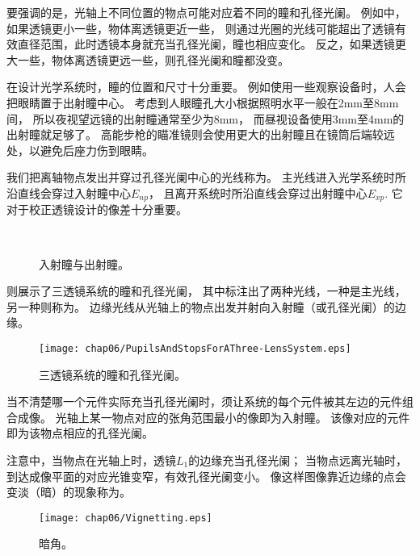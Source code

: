 要强调的是，光轴上不同位置的物点可能对应着不同的瞳和孔径光阑。
例如中，如果透镜更小一些，物体离透镜更近一些，
则通过光圈的光线可能超出了透镜有效直径范围，此时透镜本身就充当孔径光阑，瞳也相应变化。
反之，如果透镜更大一些，物体离透镜更远一些，则孔径光阑和瞳都没变。

在设计光学系统时，瞳的位置和尺寸十分重要。
例如使用一些观察设备时，人会把眼睛置于出射瞳中心。
考虑到人眼瞳孔大小根据照明水平一般在2mm至8mm间，
所以夜视望远镜的出射瞳通常至少为8mm，
而昼视设备使用3mm至4mm的出射瞳就足够了。
高能步枪的瞄准镜则会使用更大的出射瞳且在镜筒后端较远处，以避免后座力伤到眼睛。

我们把离轴物点发出并穿过孔径光阑中心的光线称为。
主光线进入光学系统时所沿直线会穿过入射瞳中心$E_{np}$，
且离开系统时所沿直线会穿过出射瞳中心$E_{xp}$.
它对于校正透镜设计的像差十分重要。
\begin{figure}[htbp]
    \centering
    \\
    \caption{入射瞳与出射瞳。}
    \label{fig:6.49}
\end{figure}

则展示了三透镜系统的瞳和孔径光阑，
其中标注出了两种光线，一种是主光线，另一种则称为。
边缘光线从光轴上的物点出发并射向入射瞳（或孔径光阑）的边缘。
\begin{figure}[htbp]
    \centering\texttt{[image: chap06/PupilsAndStopsForAThree-LensSystem.eps]}
    \caption{三透镜系统的瞳和孔径光阑。}
    \label{fig:6.50}
\end{figure}

当不清楚哪一个元件实际充当孔径光阑时，须让系统的每个元件被其左边的元件组合成像。
光轴上某一物点对应的张角范围最小的像即为入射瞳。
该像对应的元件即为该物点相应的孔径光阑。

注意中，当物点在光轴上时，透镜$L_1$的边缘充当孔径光阑；
当物点远离光轴时，到达成像平面的对应光锥变窄，有效孔径光阑变小。
像这样图像靠近边缘的点会变淡（暗）的现象称为。
\begin{figure}[htbp]
    \centering\texttt{[image: chap06/Vignetting.eps]}
    \caption{暗角。}
    \label{fig:6.51}
\end{figure}

